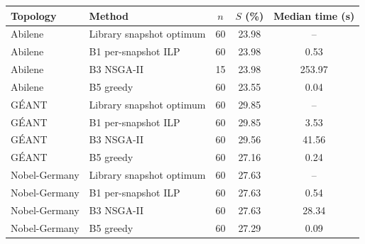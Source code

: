 \begin{tabular}{@{}llccc@{}}
\toprule
Topology & Method & $n$ & $S$ (\%) & Median time (s) \\
\midrule
Abilene & Library snapshot optimum & 60 & 23.98 & -- \\
Abilene & B1 per-snapshot ILP & 60 & 23.98 & 0.53 \\
Abilene & B3 NSGA-II & 15 & 23.98 & 253.97 \\
Abilene & B5 greedy & 60 & 23.55 & 0.04 \\
\midrule
G\'{E}ANT & Library snapshot optimum & 60 & 29.85 & -- \\
G\'{E}ANT & B1 per-snapshot ILP & 60 & 29.85 & 3.53 \\
G\'{E}ANT & B3 NSGA-II & 60 & 29.56 & 41.56 \\
G\'{E}ANT & B5 greedy & 60 & 27.16 & 0.24 \\
\midrule
Nobel-Germany & Library snapshot optimum & 60 & 27.63 & -- \\
Nobel-Germany & B1 per-snapshot ILP & 60 & 27.63 & 0.54 \\
Nobel-Germany & B3 NSGA-II & 60 & 27.63 & 28.34 \\
Nobel-Germany & B5 greedy & 60 & 27.29 & 0.09 \\

\bottomrule
\end{tabular}
